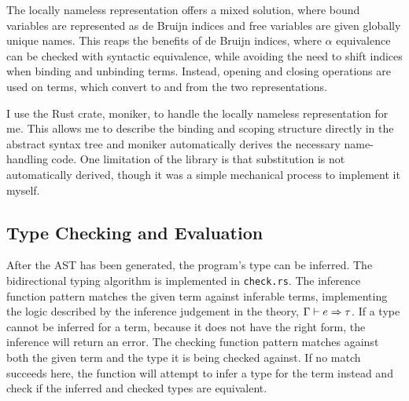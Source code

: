 \documentclass[12pt,a4paper,twoside]{report}
\begin{document}
The locally nameless representation \cite{chargueraud12} offers a mixed solution, where bound variables are represented as de Bruijn indices and free variables are given globally unique names.
This reaps the benefits of de Bruijn indices, where \(\alpha\) equivalence can be checked with syntactic equivalence, while avoiding the need to shift indices when binding and unbinding terms.
Instead, opening and closing operations are used on terms, which convert to and from the two representations.

I use the Rust crate, moniker, to handle the locally nameless representation for me.
This allows me to describe the binding and scoping structure directly in the abstract syntax tree and moniker automatically derives the necessary name-handling code.
One limitation of the library is that substitution is not automatically derived, though it was a simple mechanical process to implement it myself.

\subsection{Type Checking and Evaluation}

After the AST has been generated, the program's type can be inferred.
The bidirectional typing algorithm is implemented in \texttt{check.rs}.
The inference function pattern matches the given term against inferable terms, implementing the logic described by the inference judgement in the theory, \(\Gamma \vdash e \Rightarrow \tau\).
If a type cannot be inferred for a term, because it does not have the right form, the inference will return an error.
The checking function pattern matches against both the given term and the type it is being checked against.
If no match succeeds here, the function will attempt to infer a type for the term instead and check if the inferred and checked types are equivalent.
\end{document}
